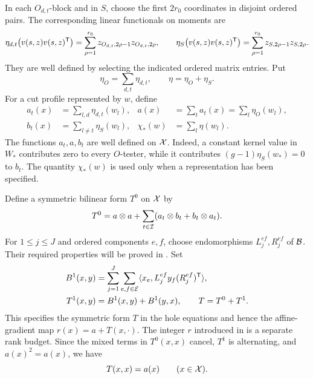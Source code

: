 In each \(O_{d,t}\)-block and in \(S\), choose the first \(2r_0\) coordinates in disjoint ordered pairs.
The corresponding linear functionals on moments are
\[
 \eta_{d,t}\bigl(v(s,z)v(s,z)^{\mathsf T}\bigr)
   =\sum_{\rho=1}^{r_0}z_{O_{d,t},2\rho-1}z_{O_{d,t},2\rho},
 \qquad
 \eta_S\bigl(v(s,z)v(s,z)^{\mathsf T}\bigr)
   =\sum_{\rho=1}^{r_0}z_{S,2\rho-1}z_{S,2\rho}.
\]
They are well defined by selecting the indicated ordered matrix entries.
Put
\[
 \eta_O=\sum_{d,t}\eta_{d,t},\qquad \eta=\eta_O+\eta_S.
\]
For a cut profile represented by \(w\), define
\begin{equation}\label{eq:cut-functionals}
 \begin{aligned}
 a_t(x)&=\sum_{l,d}\eta_{d,t}(w_l),&
 a(x)&=\sum_t a_t(x)=\sum_l\eta_O(w_l),\\
 b_t(x)&=\sum_{l\ne t}\eta_S(w_l),&
 \chi_*(w)&=\sum_l\eta(w_l).
 \end{aligned}
\end{equation}
The functions \(a_t,a,b_t\) are well defined on \(\mathcal X\).
Indeed, a constant kernel value in \(W_*\) contributes zero to every \(O\)-tester, while it contributes
\((g-1)\eta_S(w_*)=0\) to \(b_t\).
The quantity \(\chi_*(w)\) is used only when a representation has been specified.

Define a symmetric bilinear form \(T^0\) on \(\mathcal X\) by
\begin{equation}\label{eq:T-zero}
 T^0=a\otimes a+\sum_{t\in\mathcal I}(a_t\otimes b_t+b_t\otimes a_t).
\end{equation}
For \(1\le j\le J\) and ordered components \(e,f\), choose endomorphisms \(L_j^{ef},R_j^{ef}\) of \(\mathcal B\).
Their required properties will be proved in .
Set
\begin{equation}\label{eq:T-one}
 \begin{split}
 B^1(x,y)&=\sum_{j=1}^J\sum_{e,f\in\mathcal E}
   \langle x_e,L_j^{ef}y_f(R_j^{ef})^{\mathsf T}\rangle,\\
 T^1(x,y)&=B^1(x,y)+B^1(y,x),\qquad T=T^0+T^1.
 \end{split}
\end{equation}
This specifies the symmetric form \(T\) in the hole equations and
hence the affine-gradient map \(r(x)=a+T(x,\cdot)\).
The integer \(r\) introduced in  is a separate
rank budget.
Since the mixed terms in \(T^0(x,x)\) cancel, \(T^1\) is alternating, and \(a(x)^2=a(x)\), we have
\begin{equation}\label{eq:T-diagonal}
 T(x,x)=a(x)\qquad(x\in\mathcal X).
\end{equation}

